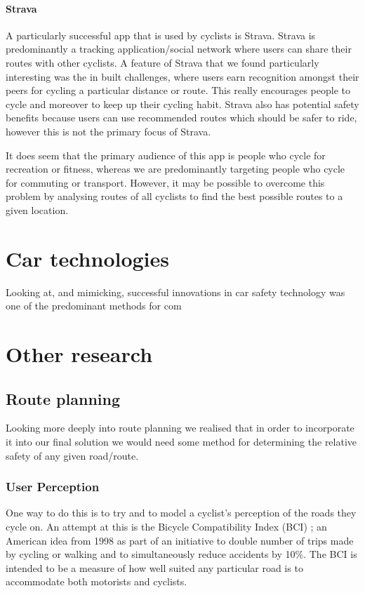\documentclass[a4paper]{report}
\begin{document}
\paragraph{Strava} A particularly successful app that is used by cyclists is Strava\cite{strava}. Strava is predominantly a tracking application/social network where users can share their routes with other cyclists. A feature of Strava that we found particularly interesting was the in built challenges, where users earn recognition amongst their peers for cycling a particular distance or route. This really encourages people to cycle and moreover to keep up their cycling habit. Strava also has potential safety benefits because users can use recommended routes which should be safer to ride, however this is not the primary focus of Strava.

It does seem that the primary audience of this app is people who cycle for recreation or fitness, whereas we are predominantly targeting people who cycle for commuting or transport. However, it may be possible to overcome this problem by analysing routes of all cyclists to find the best possible routes to a given location.


\newpage
\section{Car technologies}
Looking at, and mimicking, successful innovations in car safety technology was one of the predominant methods for com
\newpage
\section{Other research}
\subsection{Route planning}
Looking more deeply into route planning we realised that in order to incorporate it into our final solution we would need some method for determining the relative safety of any given road/route.

\subsubsection{User Perception}
One way to do this is to try and to model a cyclist's perception of the roads they cycle on. An attempt at this is the Bicycle Compatibility Index (BCI) \cite{bci-manual}; an American idea from 1998 as part of an initiative to double number of trips made by cycling or walking and to simultaneously reduce accidents by 10\%. The BCI is intended to be a measure of how well suited any particular road is to accommodate both motorists and cyclists.
\end{document}
